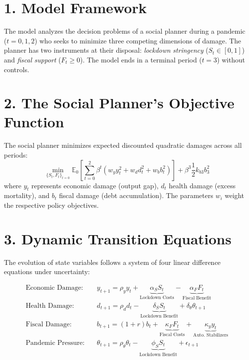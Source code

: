 
\section*{1. Model Framework}
The model analyzes the decision problems of a social planner during a pandemic ($t=0,1,2$) who seeks to minimize three competing dimensions of damage. The planner has two instruments at their disposal: \textit{lockdown stringency} ($S_t \in [0,1]$) and \textit{fiscal support} ($F_t \ge 0$). The model ends in a terminal period ($t=3$) without controls.

\section*{2. The Social Planner's Objective Function}
The social planner minimizes expected discounted quadratic damages across all periods:
\begin{equation}
    \min_{\{S_t, F_t\}_{t=0}} \mathbb{E}_0 \left[ \sum_{t=0}^{2} \beta^t \left( w_y y_t^2 + w_d d_t^2 + w_b b_t^2 \right)\right] + \beta^3 \frac{1}{2} k_{b3} b_3^2
\end{equation}
where $y_t$ represents economic damage (output gap), $d_t$ health damage (excess mortality), and $b_t$ fiscal damage (debt accumulation). The parameters $w_i$ weight the respective policy objectives.

\section*{3. Dynamic Transition Equations}
The evolution of state variables follows a system of four linear difference equations under uncertainty:

\begin{align}
    \text{Economic Damage:} \quad & y_{t+1} = \rho_y y_t + \underbrace{\alpha_S S_t}_{\text{Lockdown Costs}} - \underbrace{\alpha_F F_t}_{\text{Fiscal Benefit}} \label{eq:econ} \\
    \text{Health Damage:} \quad & d_{t+1} = \rho_d d_t - \underbrace{\delta_S S_t}_{\text{Lockdown Benefit}} + \delta_\theta \theta_{t+1} \label{eq:health} \\
    \text{Fiscal Damage:} \quad & b_{t+1} = (1+r) b_t + \underbrace{\kappa_F F_t}_{\text{Fiscal Costs}} + \underbrace{\kappa_y y_t}_{\text{Auto. Stabilizers}} \label{eq:fiscal} \\
    \text{Pandemic Pressure:} \quad & \theta_{t+1} = \rho_\theta \theta_t - \underbrace{\phi_S S_t}_{\text{Lockdown Benefit}} + \epsilon_{t+1} \label{eq:pandemic}
\end{align}


